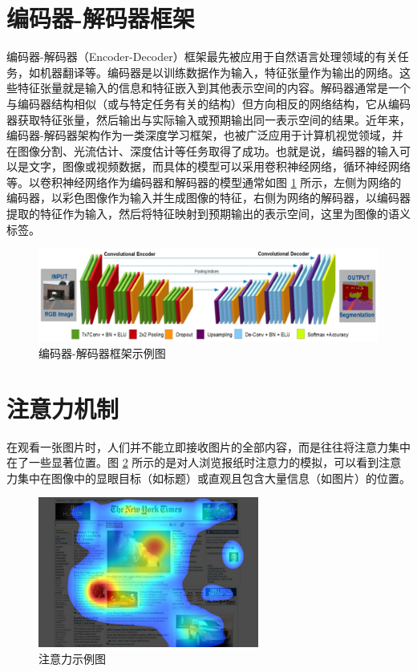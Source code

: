 \section{编码器-解码器框架}

编码器-解码器（Encoder-Decoder）框架最先被应用于自然语言处理领域的有关任务，如机器翻译等。编码器是以训练数据作为输入，特征张量作为输出的网络。这些特征张量就是输入的信息和特征嵌入到其他表示空间的内容。解码器通常是一个与编码器结构相似（或与特定任务有关的结构）但方向相反的网络结构，它从编码器获取特征张量，然后输出与实际输入或预期输出同一表示空间的结果。近年来，编码器-解码器架构作为一类深度学习框架，也被广泛应用于计算机视觉领域，并在图像分割、光流估计、深度估计等任务取得了成功。也就是说，编码器的输入可以是文字，图像或视频数据，而具体的模型可以采用卷积神经网络，循环神经网络等。以卷积神经网络作为编码器和解码器的模型通常如图 \ref{fig:fig2-9} 所示，左侧为网络的编码器，以彩色图像作为输入并生成图像的特征，右侧为网络的解码器，以编码器提取的特征作为输入，然后将特征映射到预期输出的表示空间，这里为图像的语义标签。

\begin{figure}[!htbp]
	\centering
	\includegraphics{figures/10.png}
	\caption{编码器-解码器框架示例图}
	\label{fig:fig2-9}
	\vspace{-0.8cm}  %
\end{figure}

\section{注意力机制}

在观看一张图片时，人们并不能立即接收图片的全部内容，而是往往将注意力集中在了一些显著位置。图 \ref{fig:fig2-10} 所示的是对人浏览报纸时注意力的模拟，可以看到注意力集中在图像中的显眼目标（如标题）或直观且包含大量信息（如图片）的位置。

\begin{figure}[!htbp]
	\centering
	\includegraphics{figures/11.png}
	\caption{注意力示例图}
	\label{fig:fig2-10}
	\vspace{-0.8cm}  %
\end{figure}

